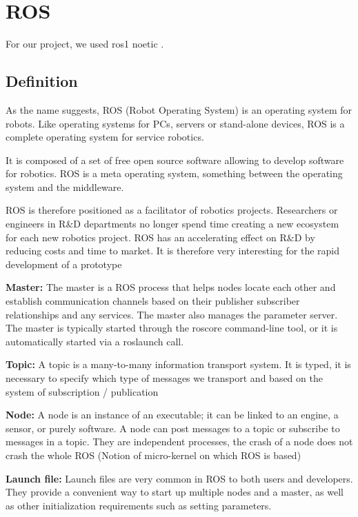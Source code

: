 \section{ROS}\insertloftspace
\setcounter{figure}{0}\setcounter{table}{0}

For our project, we used ros1 noetic \cite{ROS}.

\subsection{Definition}

As the name suggests, ROS (Robot Operating System) is an operating system for robots. Like operating systems for PCs, servers or stand-alone devices, ROS is a complete operating system for service robotics.

\bigbreak
It is composed of a set of free open source software allowing to develop software for robotics. ROS is a meta operating system, something between the operating system and the middleware.

\bigbreak
ROS is therefore positioned as a facilitator of robotics projects. Researchers or engineers in R\&D departments no longer spend time creating a new ecosystem for each new robotics project. ROS has an accelerating effect on R\&D by reducing costs and time to market. It is therefore very interesting for the rapid development of a prototype

\bigbreak
\textbf{Master:} The master is a ROS process that helps nodes locate each other and establish communication channels based on their publisher subscriber relationships and any services. The master also manages the parameter server. The master is typically started through the roscore command-line tool, or it is automatically started via a roslaunch call.

\bigbreak
\textbf{Topic:} A topic is a many-to-many information transport system. It is typed, it is necessary to specify which type of messages we transport and based on the system of subscription / publication 

\bigbreak
\textbf{Node:} A node is an instance of an executable; it can be linked to an engine, a sensor, or purely software. A node can post messages to a topic or subscribe to messages in a topic. They are independent processes, the crash of a node does not crash the whole ROS (Notion of micro-kernel on which ROS is based)

\bigbreak
\textbf{Launch file:} Launch files are very common in ROS to both users and developers. They provide a convenient way to start up multiple nodes and a master, as well as other initialization requirements such as setting parameters.

